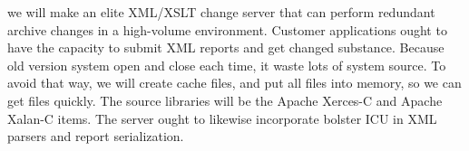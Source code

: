 we will make an elite XML/XSLT change server that can perform redundant archive changes in a high-volume environment. 
Customer applications ought to have the capacity to submit XML reports and get changed substance.
Because old version system open and close each time, it waste lots of system source. To avoid that way, we will create cache files,
and put all files into memory, so we can get files quickly.
The source libraries will be the Apache Xerces-C and Apache Xalan-C items. 
The server ought to likewise incorporate bolster ICU in XML parsers and report serialization.